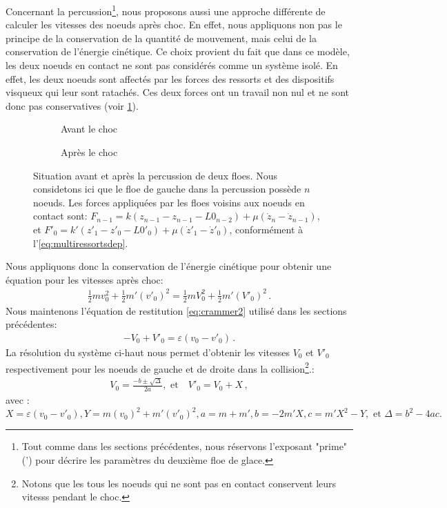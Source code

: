 Concernant la percussion\footnote{Tout comme dans les sections précédentes, nous réservons l'exposant "prime" (') pour décrire les paramètres du deuxième floe de glace.}, nous proposons aussi une approche différente de calculer les vitesses des noeuds après choc. En effet, nous appliquons non pas le principe de la conservation de la quantité de mouvement, mais celui de la conservation de l'énergie cinétique. Ce choix provient du fait que dans ce modèle, les deux noeuds en contact ne sont pas considérés comme un système isolé. En effet, les deux noeuds sont affectés par les forces des ressorts et des dispositifs visqueux qui leur sont ratachés. Ces deux forces ont un travail non nul et ne sont donc pas conservatives (voir \cref{fig:situationcontact4}). 
\begin{figure}[!h]
    \begin{subfigure}[b]{0.48\textwidth}
        \centering
        \caption{Avant le choc}
    \end{subfigure}
    \begin{subfigure}[b]{0.48\textwidth}
        \centering
        \caption{Après le choc}
    \end{subfigure}
       \caption{Situation avant et après la percussion de deux floes. Nous considetons ici que le floe de gauche dans la percussion possède $n$ noeuds. Les forces appliquées par les floes voisins aux noeuds en contact sont: $F_{n-1} = k(z_{n-1} - z_{n-1} - L0_{n-2}) + \mu (\dot z_{n} - \dot z_{n-1})$, et $F'_0 = k'(z'_1 - z'_0 - L0'_0) + \mu (\dot z'_1 - \dot z'_0)$, conformément à l'\cref{eq:multiressortsdep}.}
       \label{fig:situationcontact4}
\end{figure}
Nous appliquons donc la conservation de l'énergie cinétique pour obtenir une équation pour les vitesses après choc:
\begin{align}
    \frac{1}{2}m v_0^2 + \frac{1}{2}m' (v'_0)^2 = \frac{1}{2}m V_0^2 + \frac{1}{2}m' (V'_0)^2\,.
\end{align}
Nous maintenons l'équation de restitution \cref{eq:crammer2} utilisé dans les sections précédentes:
\begin{align}
    - V_0 + V'_0 = \varepsilon (v_0 - v'_0) \,.
\end{align}
La résolution du système ci-haut nous permet d'obtenir les vitesses $V_0$ et $V'_0$ respectivement pour les noeuds de gauche et de droite dans la collision\footnote{Notons que les tous les noeuds qui ne sont pas en contact conservent leurs vitesss pendant le choc.}.:
\begin{align}
V_0 = \frac{-b \pm \sqrt{\Delta}}{2a}, \text{ et} \quad V'_0 = V_0 + X\,,
\end{align}
avec :
$$
X= \varepsilon(v_0 - v'_0), Y = m(v_0)^2 + m'(v'_0)^2,  a = m+m', b = -2m'X, c = m'X^2 - Y, \text{ et } \Delta = b^2 - 4ac.
$$


